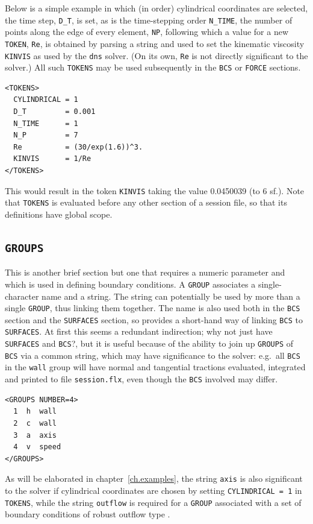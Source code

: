 \documentclass[11pt]{report}
\newcommand{\eg}{e.g.\ } \newcommand{\CC}{\mathrm{c.c.}}
\begin{document}
Below is a simple example in which (in order) cylindrical coordinates
are selected, the time step, \verb|D_T|, is set, as is the
time-stepping order \verb|N_TIME|, the number of points along the edge
of every element, \verb|NP|, following which a value for a new
\verb|TOKEN|, \verb|Re|, is obtained by parsing a string and used to
set the kinematic viscosity \verb|KINVIS| as used by the \verb|dns|
solver.  (On its own, \verb|Re| is not directly significant to the
solver.) All such \verb|TOKENS| may be used subsequently in the
\verb|BCS| or \verb|FORCE| sections.
%
{\small
\begin{verbatim}
<TOKENS>
  CYLINDRICAL = 1
  D_T         = 0.001
  N_TIME      = 1
  N_P         = 7
  Re          = (30/exp(1.6))^3.
  KINVIS      = 1/Re
</TOKENS>
\end{verbatim}
}
%
This would result in the token \verb|KINVIS| taking the value
0.0450039 (to 6 sf.). Note that \verb|TOKENS| is evaluated before any
other section of a session file, so that its definitions have global
scope.

\subsection{\texttt{GROUPS}}
\label{sec.groups}

This is another brief section but one that requires a numeric
parameter and which is used in defining boundary conditions. A
\verb|GROUP| associates a single-character name and a string.  The
string can potentially be used by more than a single \verb|GROUP|,
thus linking them together.  The name is also used both in the
\verb|BCS| section and the \verb|SURFACES| section, so provides a
short-hand way of linking \verb|BCS| to \verb|SURFACES|.  At first
this seems a redundant indirection; why not just have \verb|SURFACES|
and \verb|BCS|?, but it is useful because of the ability to join up
\verb|GROUPS| of \verb|BCS| via a common string, which may have
significance to the solver: \eg all \verb|BCS| in the \verb|wall|
group will have normal and tangential tractions evaluated, integrated
and printed to file \verb|session.flx|, even though the \verb|BCS|
involved may differ.
%
{\small
\begin{verbatim}
<GROUPS NUMBER=4>
  1  h  wall
  2  c  wall
  3  a  axis
  4  v  speed
</GROUPS>
\end{verbatim}
}
%
As will be elaborated in chapter~\ref{ch.examples}, the string
\verb|axis| is also significant to the solver if cylindrical
coordinates are chosen by setting \verb|CYLINDRICAL = 1| in
\verb|TOKENS|, while the string \verb|outflow| is required for a
\verb|GROUP| associated with a set of boundary conditions of robust
outflow type \citep{dkc14}.
\end{document}
